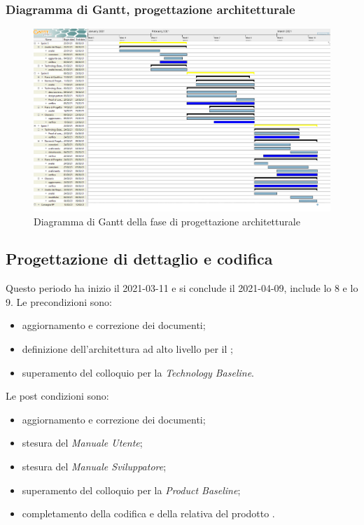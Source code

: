 \subsubsection{Diagramma di Gantt, progettazione architetturale}
\begin{figure}[H]
    \centering
    \includegraphics[scale = 0.8]{components/img/progettazione_architetturale.png}
    \caption{Diagramma di Gantt della fase di progettazione architetturale}
    \label{fig:Diagramma di Gantt, fase di progettazione architetturale}
\end{figure}

\newpage
\subsection{Progettazione di dettaglio e codifica}
Questo periodo ha inizio il 2021-03-11 e si conclude il 2021-04-09, include lo  8 e lo  9.
Le precondizioni sono:
\begin{itemize}
	\item aggiornamento e correzione dei documenti;
	\item definizione dell'architettura ad alto livello per il ;
	\item  superamento del colloquio per la \textit{Technology Baseline}.
\end{itemize}
Le post condizioni sono:
\begin{itemize}
	\item aggiornamento e correzione dei documenti;
	\item stesura del \textit{Manuale Utente};
	\item stesura del \textit{Manuale Sviluppatore};
	\item superamento del colloquio per la \textit{Product Baseline};
	\item completamento della codifica e della relativa  del prodotto .
\end{itemize}
